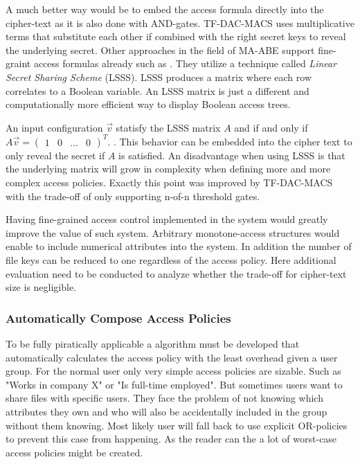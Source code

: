 A much better way would be to embed the access formula directly into the cipher-text as it is also done with AND-gates. TF-DAC-MACS uses multiplicative terms that substitute each other if combined with the right secret keys to reveal the underlying secret. Other approaches in the field of MA-ABE support fine-graint access formulas already such as \cite{liu2016practical} \cite{yang2013dac} \cite{lewko2011decentralizing}. They utilize a technique called \textit{Linear Secret Sharing Scheme} (\ac{LSSS}). LSSS produces a matrix where each row correlates to a Boolean variable. An LSSS matrix is just a different and computationally more efficient way to display Boolean access trees. 

An input configuration $\vec{v}$ statisfy the LSSS matrix $A$ and if and only if 
$A\vec{v} = \begin{pmatrix}1 & 0 & \dots & 0 \end{pmatrix}^T$. \cite{liu2010efficient}. This behavior can be embedded into the cipher text to only reveal the secret if $A$ is satisfied. An disadvantage when using LSSS is that the underlying matrix will grow in complexity when defining more and more complex access policies. Exactly this point was improved by TF-DAC-MACS with the trade-off of only supporting n-of-n threshold gates. 

Having fine-grained access control implemented in the system would greatly improve the value of such system. Arbitrary monotone-access structures would enable to include numerical attributes into the system. In addition the number of file keys can be reduced to one regardless of the access policy. Here additional evaluation need to be conducted to analyze whether the trade-off for cipher-text size is negligible. 

\subsubsection{Automatically Compose Access Policies}
To be fully piratically applicable a algorithm must be developed that automatically calculates the access policy with the least overhead given a user group. For the normal user only very simple access policies are sizable. Such as "Works in company X" or "Is full-time employed". 
But sometimes users want to share files with specific users. They face the problem of not knowing which attributes they own and who will also be accidentally included in the group without them knowing. Most likely user will fall back to use explicit OR-policies to prevent this case from happening. As the reader can the a lot of worst-case access policies might be created. 

